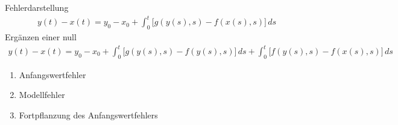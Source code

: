 \begin{frame}{Fehlerdarstellung}
  \begin{gather*}
    y(t)-x(t) = y_0-x_0
    + \int_0^t \bigl[
    g(y(s),s) - f(x(s),s)\bigr] \,ds
  \end{gather*}
  \pause
  Ergänzen einer null
  \begin{gather*}
    y(t)-x(t) = y_0-x_0
    + \int_0^t \bigl[
    g(y(s),s) - f(y(s),s)\bigr] \,ds
    + \int_0^t \bigl[
    f(y(s),s) - f(x(s),s)\bigr] \,ds
  \end{gather*}
  \begin{enumerate}
  \item Anfangswertfehler
  \item Modellfehler
  \item Fortpflanzung des Anfangswertfehlers
  \end{enumerate}
\end{frame}

